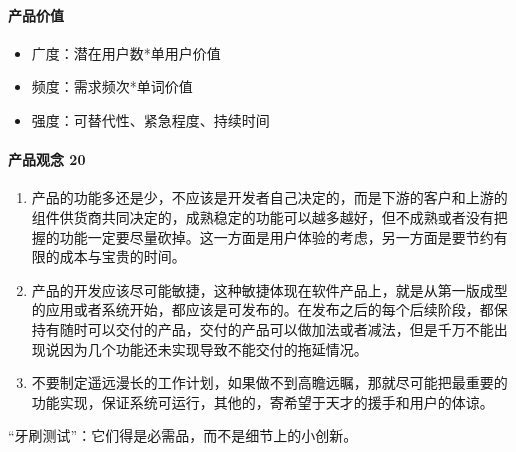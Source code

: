 \documentclass[letterpaper,10pt,english]{sphinxmanual}
\begin{document}
\paragraph{产品价值}
\label{\detokenize{chapter_introduction/Product:id51}}\begin{itemize}
\item {} 
广度：潜在用户数*单用户价值

\item {} 
频度：需求频次*单词价值

\item {} 
强度：可替代性、紧急程度、持续时间

\end{itemize}


\paragraph{产品观念 20\sphinxfootnotemark[57]}
\label{\detokenize{chapter_introduction/Product:id52}}%
\begin{footnotetext}[57]\sphinxAtStartFootnote
{}
%
\end{footnotetext}\ignorespaces \begin{enumerate}
%
\item {} 
产品的功能多还是少，不应该是开发者自己决定的，而是下游的客户和上游的组件供货商共同决定的，成熟稳定的功能可以越多越好，但不成熟或者没有把握的功能一定要尽量砍掉。这一方面是用户体验的考虑，另一方面是要节约有限的成本与宝贵的时间。

\item {} 
产品的开发应该尽可能敏捷，这种敏捷体现在软件产品上，就是从第一版成型的应用或者系统开始，都应该是可发布的。在发布之后的每个后续阶段，都保持有随时可以交付的产品，交付的产品可以做加法或者减法，但是千万不能出现说因为几个功能还未实现导致不能交付的拖延情况。

\item {} 
不要制定遥远漫长的工作计划，如果做不到高瞻远瞩，那就尽可能把最重要的功能实现，保证系统可运行，其他的，寄希望于天才的援手和用户的体谅。

\end{enumerate}

“牙刷测试”：它们得是必需品，而不是细节上的小创新。%
\begin{footnote}[58]\sphinxAtStartFootnote
{}
%
\end{footnote}
\end{document}
